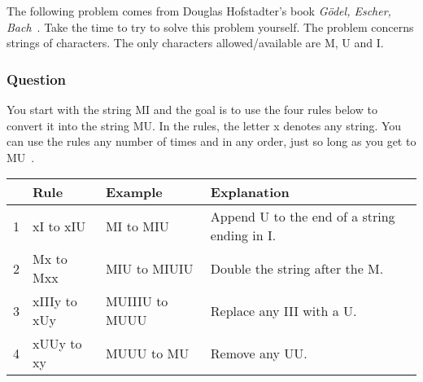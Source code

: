 

\noindent
The following problem comes from Douglas Hofstadter's book \emph{Gödel, Escher, Bach}~\cite{hofstadter79}.
Take the time to try to solve this problem yourself.
The problem concerns strings of characters.
The only characters allowed/available are M, U and I.

\subsubsection*{Question}
You start with the string MI and the goal is to use the four rules below to convert it into the string MU.
In the rules, the letter x denotes any string.
You can use the rules any number of times and in any order, just so long as you get to MU~\cite{muwikipedia}.


\begin{center}
\begin{tabular}{rlll}

 & Rule & Example & Explanation  \\
\midrule
1 &	xI to xIU & MI	to	MIU & Append U to the end of a string ending in I. \\
2 &	Mx to Mxx & MIU	to	MIUIU & Double the string after the M. \\
3 &	xIIIy to xUy & MUIIIU	to	MUUU & Replace any III with a U. \\
4 &	xUUy to xy & MUUU	to	MU & Remove any UU. \\
\bottomrule
\end{tabular}
\end{center}